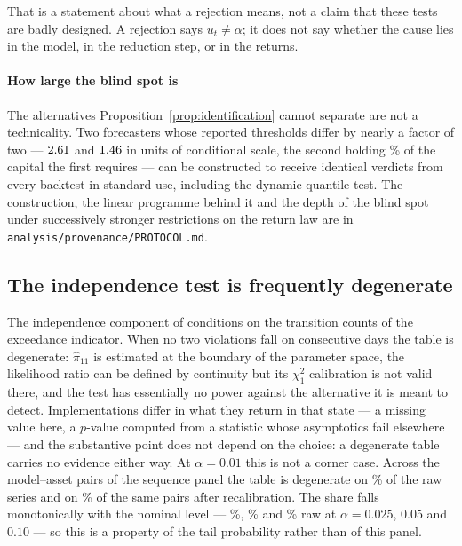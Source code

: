 \documentclass[preprint,11pt,authoryear]{elsarticle}
\newcommand{\1}{\boldsymbol{1}}
\begin{document}
That is a statement about what a rejection means, not a claim that these tests
are badly designed. A rejection says $u_t\neq\alpha$; it does not say whether the
cause lies in the model, in the reduction step, or in the returns.

\paragraph{How large the blind spot is} The alternatives
Proposition~\ref{prop:identification} cannot separate are not a technicality.
Two forecasters whose reported thresholds differ by nearly a factor of two ---
$2.61$ and $1.46$ in units of conditional scale, the second
holding \nPairCapitalPct\% of the capital the first requires --- can be
constructed to receive identical verdicts from every backtest in standard use,
including the dynamic quantile test. The construction, the linear programme
behind it and the depth of the blind spot under successively stronger
restrictions on the return law are in \texttt{analysis/provenance/PROTOCOL.md}.

\subsection{The independence test is frequently degenerate}
\label{sec:blindspot_cc}

The independence component of \citet{christoffersen1998} conditions on the
transition counts of the exceedance indicator. When no two violations fall on
consecutive days the table is degenerate: $\hat\pi_{11}$ is estimated at the
boundary of the parameter space, the likelihood ratio can be defined by
continuity but its $\chi^2_1$ calibration is not valid there, and the test has
essentially no power against the alternative it is meant to detect. Implementations differ in what they return in that state --- a missing
value here, a $p$-value computed from a statistic whose asymptotics fail
elsewhere --- and the substantive point does not depend on the choice: a
degenerate table carries no evidence either way. At $\alpha = 0.01$ this is not a
corner case. Across the \nSeqPairs{} model--asset pairs of the sequence panel the
table is degenerate on \nSeqCCUndefRawOne\% of the raw series and on
\nSeqCCUndefCorOne\% of the same pairs after recalibration. The share falls
monotonically with the nominal level --- \nSeqCCUndefRawTwoFive\%,
\nSeqCCUndefRawFive\% and \nSeqCCUndefRawTen\% raw at $\alpha = 0.025$, $0.05$
and $0.10$ --- so this is a property of the tail probability rather than of this
panel.
\end{document}
